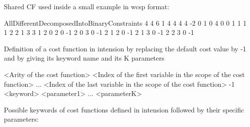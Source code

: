 \documentclass{article}
\begin{document}
\begin{DoxyItemize}
\begin{DoxyItemize}
\item Shared C\-F used inside a small example in wcsp format\-: 
\begin{DoxyCode}
AllDifferentDecomposedIntoBinaryConstraints 4 4 6 1
4 4 4 4
-2 0 1 0 4
0 0 1
1 1 1
2 2 1
3 3 1
2 0 2 0 -1
2 0 3 0 -1
2 1 2 0 -1
2 1 3 0 -1
2 2 3 0 -1
\end{DoxyCode}

\item Definition of a cost function in intension by replacing the default cost value by -\/1 and by giving its keyword name and its K parameters \begin{DoxyVerb}<Arity of the cost function>
<Index of the first variable in the scope of the cost function>
...
<Index of the last variable in the scope of the cost function>
-1
<keyword>
<parameter1>
...
<parameterK>
\end{DoxyVerb}

\end{DoxyItemize}
\end{DoxyItemize}Possible keywords of cost functions defined in intension followed by their specific parameters\-:
\end{document}
